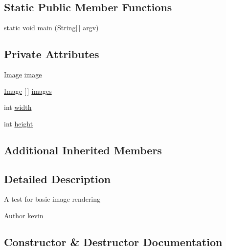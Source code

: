 \subsection*{Static Public Member Functions}
\begin{DoxyCompactItemize}
\item 
static void \mbox{\hyperlink{classorg_1_1newdawn_1_1slick_1_1tests_1_1_image_corner_test_a7d9fa44ac7909af63a91c21cadd48c62}{main}} (String\mbox{[}$\,$\mbox{]} argv)
\end{DoxyCompactItemize}
\subsection*{Private Attributes}
\begin{DoxyCompactItemize}
\item 
\mbox{\hyperlink{classorg_1_1newdawn_1_1slick_1_1_image}{Image}} \mbox{\hyperlink{classorg_1_1newdawn_1_1slick_1_1tests_1_1_image_corner_test_a0443d8cc581ff7ac5eef80dbde801a8c}{image}}
\item 
\mbox{\hyperlink{classorg_1_1newdawn_1_1slick_1_1_image}{Image}} \mbox{[}$\,$\mbox{]} \mbox{\hyperlink{classorg_1_1newdawn_1_1slick_1_1tests_1_1_image_corner_test_ae322db8fe27b43b8aa623e57d95c7354}{images}}
\item 
int \mbox{\hyperlink{classorg_1_1newdawn_1_1slick_1_1tests_1_1_image_corner_test_aca2e57fb5527d6b042197d6cdc90b150}{width}}
\item 
int \mbox{\hyperlink{classorg_1_1newdawn_1_1slick_1_1tests_1_1_image_corner_test_ac43e9974d6954165e5af5b8d748df6a0}{height}}
\end{DoxyCompactItemize}
\subsection*{Additional Inherited Members}


\subsection{Detailed Description}
A test for basic image rendering

\begin{DoxyAuthor}{Author}
kevin 
\end{DoxyAuthor}


\subsection{Constructor \& Destructor Documentation}
\mbox{\label{classorg_1_1newdawn_1_1slick_1_1tests_1_1_image_corner_test_ade0380ea229639b40e852dd729408be7}} 
